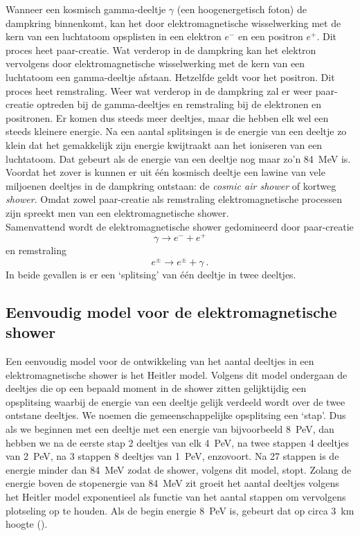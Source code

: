 Wanneer een kosmisch gamma-deeltje $\gamma$ (een hoogenergetisch foton)
de dampkring binnenkomt, kan het door elektromagnetische wisselwerking
met de kern van een luchtatoom opsplisten in een elektron $e^-$ en een
positron $e^+$. Dit proces heet paar-creatie. Wat verderop in de
dampkring kan het elektron vervolgens door elektromagnetische
wisselwerking met de kern van een luchtatoom een gamma-deeltje afstaan.
Hetzelfde geldt voor het positron. Dit proces heet remstraling. Weer wat
verderop in de dampkring zal er weer paar-creatie optreden bij de
gamma-deeltjes en remstraling bij de elektronen en positronen. Er komen
dus steeds meer deeltjes, maar die hebben elk wel een steeds kleinere
energie. Na een aantal splitsingen is de energie van een deeltje zo
klein dat het gemakkelijk zijn energie kwijtraakt aan het ioniseren van
een luchtatoom. Dat gebeurt als de energie van een deeltje nog maar zo'n
\SI{84}{\mega\electronvolt} is. Voordat het zover is kunnen er uit één
kosmisch deeltje een lawine van vele miljoenen deeltjes in de dampkring
ontstaan: de \emph{cosmic air shower} of kortweg \emph{shower}. Omdat
zowel paar-creatie als remstraling elektromagnetische processen zijn
spreekt men van een elektromagnetische shower. \\

Samenvattend wordt de elektromagnetische shower gedomineerd door paar-creatie
\begin{equation}
    \gamma \rightarrow e^- + e^+ \nonumber
\end{equation}
en remstraling
\begin{equation} 
    e^\pm \rightarrow e^\pm + \gamma \ . \nonumber
\end{equation}
In beide gevallen is er een `splitsing' van één deeltje in twee deeltjes.  


\subsection{Eenvoudig model voor de elektromagnetische shower}

Een eenvoudig model voor de ontwikkeling van het aantal deeltjes in een
elektromagnetische shower is het Heitler model. Volgens dit model
ondergaan de deeltjes die op een bepaald moment in de shower zitten
gelijktijdig een opsplitsing waarbij de energie van een deeltje gelijk
verdeeld wordt over de twee ontstane deeltjes. We noemen die
gemeenschappelijke opsplitsing een `stap'. Dus als we beginnen met een
deeltje met een energie van bijvoorbeeld \SI{8}{\peta\electronvolt}, dan
hebben we na de eerste stap 2 deeltjes van elk
\SI{4}{\peta\electronvolt}, na twee stappen 4 deeltjes van
\SI{2}{\peta\electronvolt}, na 3 stappen 8 deeltjes van
\SI{1}{\peta\electronvolt}, enzovoort. Na 27 stappen is de energie
minder dan \SI{84}{\mega\electronvolt} zodat de shower, volgens dit
model, stopt. Zolang de energie boven de stopenergie van
\SI{84}{\mega\electronvolt} zit groeit het aantal deeltjes volgens het
Heitler model exponentieel als functie van het aantal stappen om
vervolgens plotseling op te houden. Als de begin energie
\SI{8}{\peta\electronvolt} is, gebeurt dat op circa \SI{3}{\km} hoogte
(). 

